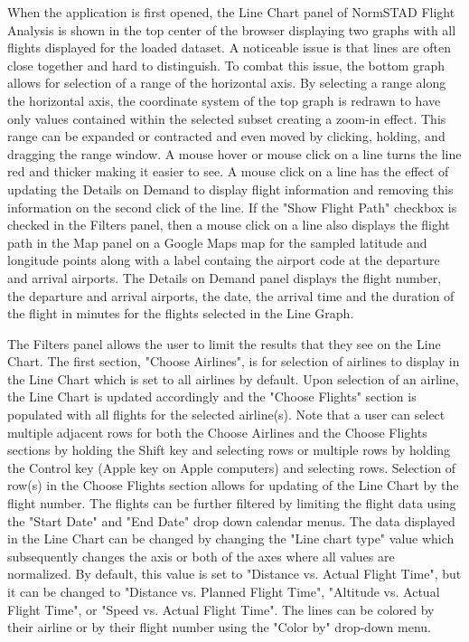 \documentclass{sig-alternate}
\begin{document}
When the application is first opened, the Line Chart panel of NormSTAD Flight Analysis is shown in the top
center of the browser displaying two graphs with all flights displayed for the 
loaded dataset. A noticeable issue is that lines are often close together and hard to
distinguish.
 To combat this issue, the bottom graph allows for selection of a range of 
the horizontal axis. By selecting a range along the horizontal axis, the coordinate
system of the top graph is redrawn to have only values contained within the selected subset
creating a zoom-in effect. This range can be expanded or contracted and even moved by clicking,
holding, and dragging the range window. A mouse hover or mouse click on a
line turns the line red and 
thicker making it easier to see. A mouse click on a line has the effect of
updating the Details on Demand
to display flight information and removing this information on the second click of the line. 
If the "Show Flight Path" checkbox is checked in the Filters panel, then a mouse click on a line also displays
the flight path in the Map panel on a Google Maps map for the sampled latitude and longitude points along with a label containg the airport code at the departure and arrival airports.
The Details on Demand panel displays the flight number, the departure and arrival airports, the date,
the arrival time and the duration of the flight in minutes for the flights selected in the
Line Graph.

The Filters panel allows the user to limit the results that they see on the Line
Chart. The first section, "Choose Airlines", is for selection of airlines to display 
in the Line Chart which is set to all airlines by default.
Upon selection of an airline, the Line Chart is updated accordingly and the
"Choose Flights" section is populated with all
flights for the selected airline(s). Note that a user can select multiple adjacent
rows for both the Choose Airlines and the Choose Flights sections
by holding the Shift key and selecting rows or 
multiple rows by holding the Control key (Apple key on Apple computers) and selecting rows. 
Selection of row(s) in the Choose Flights section allows for updating of the Line Chart
by the flight number. The flights can be further filtered by limiting the flight data
using the "Start Date" and "End Date" drop down calendar menus. The data displayed 
in the Line Chart can be changed by changing the "Line chart type" value which subsequently
changes the axis or both of the axes where 
all values are normalized. By default, this value is set to "Distance vs. Actual Flight Time",
but it can be changed to "Distance vs. Planned Flight Time", "Altitude vs. Actual Flight Time",
or "Speed vs. Actual Flight Time". The lines can be colored by their airline or by their 
flight number using the "Color by" drop-down menu. 
\end{document}
